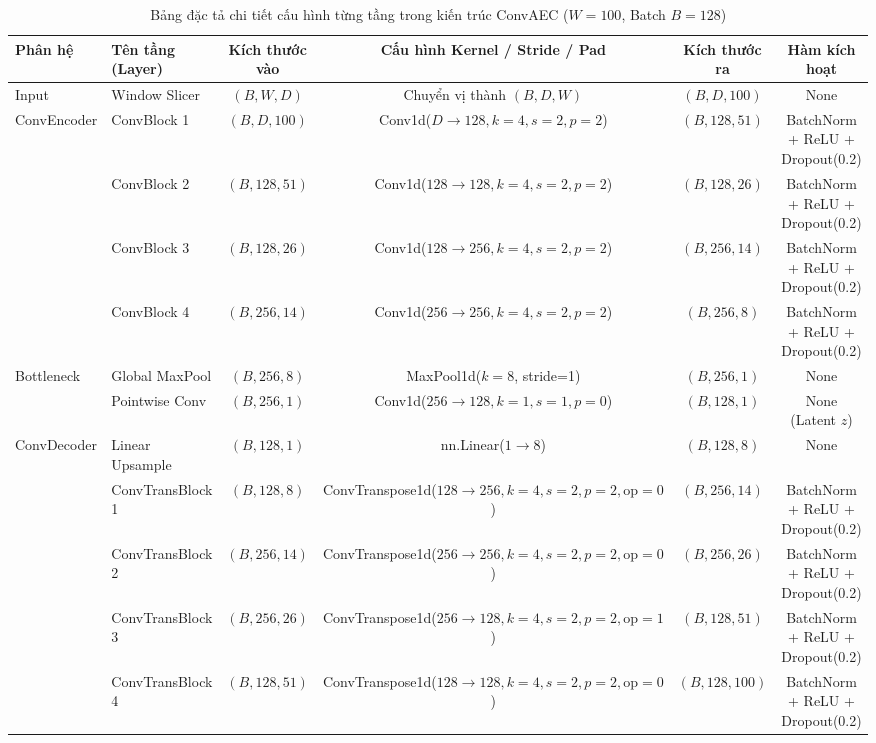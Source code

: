 \documentclass[11pt,journal,onecolumn]{IEEEtran}
\begin{document}
\begin{table}[htbp]
\centering
\caption{Bảng đặc tả chi tiết cấu hình từng tầng trong kiến trúc ConvAEC ($W=100$, Batch $B=128$)}
\label{tab:convaec_layers}
\begin{tabular}{llcccc}
\toprule
\textbf{Phân hệ} & \textbf{Tên tầng (Layer)} & \textbf{Kích thước vào} & \textbf{Cấu hình Kernel / Stride / Pad} & \textbf{Kích thước ra} & \textbf{Hàm kích hoạt} \\
\midrule
Input & Window Slicer & $(B, W, D)$ & Chuyển vị thành $(B, D, W)$ & $(B, D, 100)$ & None \\
\midrule
\multirow{4}{*}{ConvEncoder} 
& ConvBlock 1 & $(B, D, 100)$ & Conv1d($D \rightarrow 128, k=4, s=2, p=2$) & $(B, 128, 51)$ & BatchNorm + ReLU + Dropout(0.2) \\
& ConvBlock 2 & $(B, 128, 51)$ & Conv1d($128 \rightarrow 128, k=4, s=2, p=2$) & $(B, 128, 26)$ & BatchNorm + ReLU + Dropout(0.2) \\
& ConvBlock 3 & $(B, 128, 26)$ & Conv1d($128 \rightarrow 256, k=4, s=2, p=2$) & $(B, 256, 14)$ & BatchNorm + ReLU + Dropout(0.2) \\
& ConvBlock 4 & $(B, 256, 14)$ & Conv1d($256 \rightarrow 256, k=4, s=2, p=2$) & $(B, 256, 8)$ & BatchNorm + ReLU + Dropout(0.2) \\
\midrule
\multirow{2}{*}{Bottleneck}
& Global MaxPool & $(B, 256, 8)$ & MaxPool1d($k=8$, stride=1) & $(B, 256, 1)$ & None \\
& Pointwise Conv & $(B, 256, 1)$ & Conv1d($256 \rightarrow 128, k=1, s=1, p=0$) & $(B, 128, 1)$ & None (Latent $z$) \\
\midrule
\multirow{6}{*}{ConvDecoder}
& Linear Upsample & $(B, 128, 1)$ & nn.Linear($1 \rightarrow 8$) & $(B, 128, 8)$ & None \\
& ConvTransBlock 1 & $(B, 128, 8)$ & ConvTranspose1d($128 \rightarrow 256, k=4, s=2, p=2, \text{op}=0$) & $(B, 256, 14)$ & BatchNorm + ReLU + Dropout(0.2) \\
& ConvTransBlock 2 & $(B, 256, 14)$ & ConvTranspose1d($256 \rightarrow 256, k=4, s=2, p=2, \text{op}=0$) & $(B, 256, 26)$ & BatchNorm + ReLU + Dropout(0.2) \\
& ConvTransBlock 3 & $(B, 256, 26)$ & ConvTranspose1d($256 \rightarrow 128, k=4, s=2, p=2, \text{op}=1$) & $(B, 128, 51)$ & BatchNorm + ReLU + Dropout(0.2) \\
& ConvTransBlock 4 & $(B, 128, 51)$ & ConvTranspose1d($128 \rightarrow 128, k=4, s=2, p=2, \text{op}=0$) & $(B, 128, 100)$ & BatchNorm + ReLU + Dropout(0.2) \\

\end{tabular}
\end{table}
\end{document}

